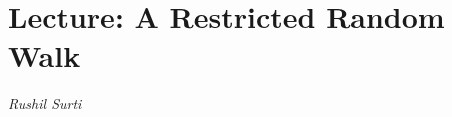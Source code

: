 \documentclass[12pt]{article}
\theoremstyle{customthm}
\begin{document}
\section*{Lecture: A Restricted Random Walk}

\vspace{-0.2cm}

\textit{Rushil Surti}

\vspace{0.2cm}


\end{document}
